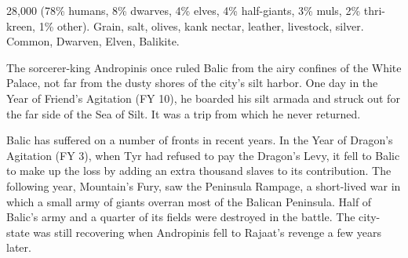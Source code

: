 {28,000 (78\% humans, 8\% dwarves, 4\% elves, 4\% half-giants, 3\% muls, 2\% thri-kreen, 1\% other).}
{Grain, salt, olives, kank nectar, leather, livestock, silver.}
{Common, Dwarven, Elven, Balikite.}
{

	The sorcerer-king Andropinis once ruled Balic from the airy confines of the White Palace, not far from the dusty shores of the city's silt harbor. One day in the Year of Friend's Agitation (FY 10), he boarded his silt armada and struck out for the far side of the Sea of Silt. It was a trip from which he never returned.

	Balic has suffered on a number of fronts in recent years. In the Year of Dragon's Agitation (FY 3), when Tyr had refused to pay the Dragon's Levy, it fell to Balic to make up the loss by adding an extra thousand slaves to its contribution. The following year, Mountain's Fury, saw the Peninsula Rampage, a short-lived war in which a small army of giants overran most of the Balican Peninsula. Half of Balic's army and a quarter of its fields were destroyed in the battle. The city-state was still recovering when Andropinis fell to Rajaat's revenge a few years later.
}
